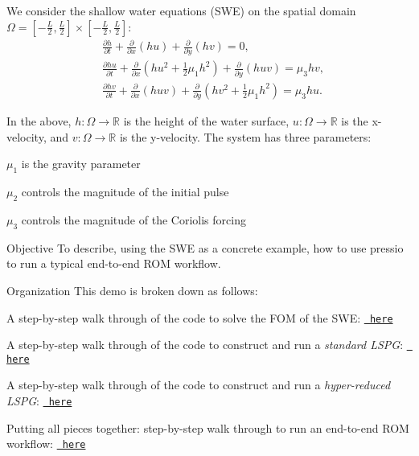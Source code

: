 We consider the shallow water equations (S\+WE) on the spatial domain $\Omega = [-\frac{L}{2},\frac{L}{2}] \times [-\frac{L}{2},\frac{L}{2}]$\+: \[ \begin{split} &\frac{\partial h}{\partial t} + \frac{\partial}{\partial x }( h u) + \frac{\partial}{\partial y }( h v) = 0,\\ &\frac{\partial h u}{\partial t} + \frac{\partial}{\partial x} (h u^2 + \frac{1}{2} \mu_1 h^2) + \frac{\partial}{\partial y }( h u v) = \mu_3 hv,\\ &\frac{\partial h v}{\partial t} + \frac{\partial}{\partial x} (h u v) + \frac{\partial}{\partial y }( h v^2 + \frac{1}{2} \mu_1 h^2) = \mu_3 hu. \end{split} \]

In the above, $h : \Omega \rightarrow \mathbb{R}$ is the height of the water surface, $u : \Omega \rightarrow \mathbb{R}$ is the x-\/velocity, and $v : \Omega \rightarrow \mathbb{R}$ is the y-\/velocity. The system has three parameters\+:
\begin{DoxyItemize}
\item $\mu_1$ is the gravity parameter
\item $\mu_2$ controls the magnitude of the initial pulse
\item $\mu_3$ controls the magnitude of the Coriolis forcing
\end{DoxyItemize}





\begin{DoxyParagraph}{Objective}
To describe, using the S\+WE as a concrete example, how to use pressio to run a typical end-\/to-\/end R\+OM workflow.
\end{DoxyParagraph}


\begin{DoxyParagraph}{Organization}
This demo is broken down as follows\+:
\begin{DoxyEnumerate}
\item A step-\/by-\/step walk through of the code to solve the F\+OM of the S\+WE\+: \href{./md_pages_swe_fom.html}{\texttt{ here}}
\item A step-\/by-\/step walk through of the code to construct and run a {\itshape standard L\+S\+PG}\+: \href{./md_pages_swe_lspg.html}{\texttt{ here}}
\item A step-\/by-\/step walk through of the code to construct and run a {\itshape hyper-\/reduced L\+S\+PG}\+: \href{./md_pages_swe_hrlspg.html}{\texttt{ here}}
\item Putting all pieces together\+: step-\/by-\/step walk through to run an end-\/to-\/end R\+OM workflow\+: \href{./md_pages_swe_endtoend.html}{\texttt{ here}} 
\end{DoxyEnumerate}
\end{DoxyParagraph}
